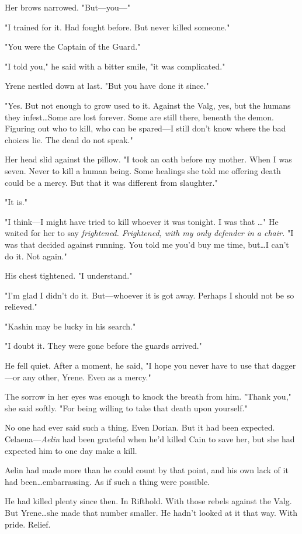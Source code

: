 Her brows narrowed.
"But---you---"

"I trained for it.
Had fought before.
But never killed someone."

"You were the Captain of the Guard."

"I told you," he said with a bitter smile, "it was complicated."

Yrene nestled down at last.
"But you have done it since."

"Yes.
But not enough to grow used to it.
Against the Valg, yes, but the humans they infest\ldots Some are lost forever.
Some are still there, beneath the demon.
Figuring out who to kill, who can be spared---I still don't know where the bad choices lie.
The dead do not speak."

Her head slid against the pillow.
"I took an oath before my mother.
When I was seven.
Never to kill a human being.
Some healings 
she told me offering death could be a mercy.
But that it was different from slaughter."

"It is."

"I think---I might have tried to kill whoever it was tonight.
I was that \ldots" He waited for her to say \emph{frightened.
Frightened, with my only defender in a chair.} "I was that decided against running.
You told me you'd buy me time, but\ldots I can't do it.
Not again."

His chest tightened.
"I understand."

"I'm glad I didn't do it.
But---whoever it is got away.
Perhaps I should not be so relieved."

"Kashin may be lucky in his search."

"I doubt it.
They were gone before the guards arrived."

He fell quiet.
After a moment, he said, "I hope you never have to use that dagger---or any other, Yrene.
Even as a mercy."

The sorrow in her eyes was enough to knock the breath from him.
"Thank you," she said softly.
"For being willing to take that death upon yourself."

No one had ever said such a thing.
Even Dorian.
But it had been expected.
Celaena---\emph{Aelin} had been grateful when he'd killed Cain to save her, but she had expected him to one day make a kill.

Aelin had made more than he could count by that point, and his own lack of it had been\ldots embarrassing.
As if such a thing were possible.

He had killed plenty since then.
In Rifthold.
With those rebels against the Valg.
But Yrene\ldots she made that number smaller.
He hadn't looked at it that way.
With pride.
Relief.

